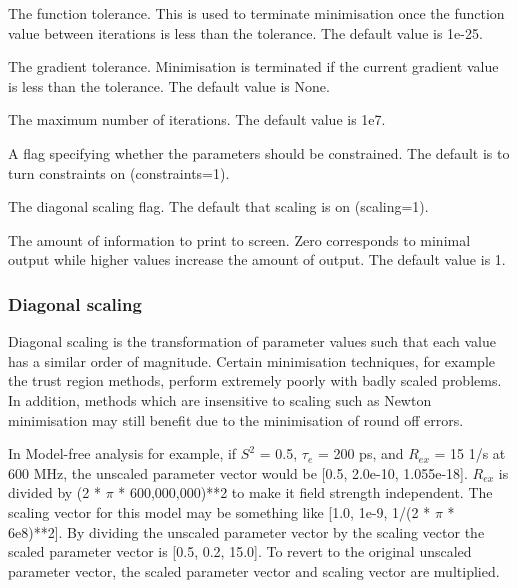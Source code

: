    The function tolerance.  This is used to terminate minimisation once the function value between iterations is less than the tolerance.  The default value is 1e-25.   

   The gradient tolerance.  Minimisation is terminated if the current gradient value is less than the tolerance.  The default value is None.   

   The maximum number of iterations.  The default value is 1e7.   

   A flag specifying whether the parameters should be constrained.  The default is to turn constraints on (constraints=1).   

   The diagonal scaling flag.  The default that scaling is on (scaling=1).  

  

   The amount of information to print to screen.  Zero corresponds to minimal output while higher values increase the amount of output.  The default value is 1.  

  

  
 \subsubsection{Diagonal scaling} 

 Diagonal scaling is the transformation of parameter values such that each value has a similar order of magnitude.  Certain minimisation techniques, for example the trust region methods, perform extremely poorly with badly scaled problems.  In addition, methods which are insensitive to scaling such as Newton minimisation may still benefit due to the minimisation of round off errors. 
  

 In Model-free analysis for example, if $S^2$ = 0.5, $\tau_e$ = 200 ps, and $R_{ex}$ = 15 1/s at 600 MHz, the unscaled parameter vector would be [0.5, 2.0e-10, 1.055e-18].  $R_{ex}$ is divided by (2 * $\pi$ * 600,000,000)**2 to make it field strength independent.  The scaling vector for this model may be something like [1.0, 1e-9, 1/(2 * $\pi$ * 6e8)**2].  By dividing the unscaled parameter vector by the scaling vector the scaled parameter vector is [0.5, 0.2, 15.0].  To revert to the original unscaled parameter vector, the scaled parameter vector and scaling vector are multiplied. 
  

